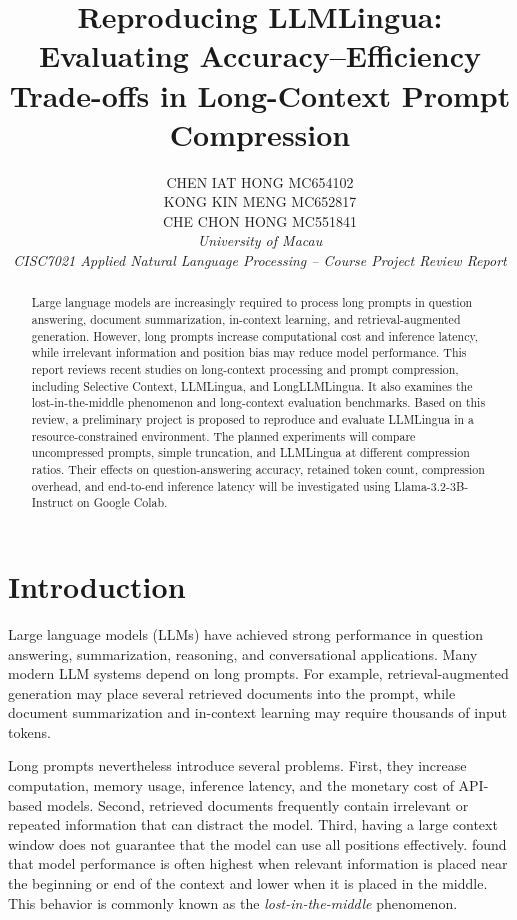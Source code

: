 \documentclass[10pt,a4paper,twocolumn]{article}
\title{Reproducing LLMLingua: Evaluating Accuracy--Efficiency Trade-offs in Long-Context Prompt Compression}
\author{
CHEN IAT HONG \quad MC654102\\
KONG KIN MENG \quad MC652817\\
CHE CHON HONG \quad MC551841\\
\textit{University of Macau}\\
\textit{CISC7021 Applied Natural Language Processing -- Course Project Review Report}
}
\date{}
\begin{document}
\maketitle
\vspace{-0.8cm}

\begin{abstract}
Large language models are increasingly required to process long prompts in question answering, document summarization, in-context learning, and retrieval-augmented generation. However, long prompts increase computational cost and inference latency, while irrelevant information and position bias may reduce model performance. This report reviews recent studies on long-context processing and prompt compression, including Selective Context, LLMLingua, and LongLLMLingua. It also examines the lost-in-the-middle phenomenon and long-context evaluation benchmarks. Based on this review, a preliminary project is proposed to reproduce and evaluate LLMLingua in a resource-constrained environment. The planned experiments will compare uncompressed prompts, simple truncation, and LLMLingua at different compression ratios. Their effects on question-answering accuracy, retained token count, compression overhead, and end-to-end inference latency will be investigated using Llama-3.2-3B-Instruct on Google Colab.
\end{abstract}

\section{Introduction}

Large language models (LLMs) have achieved strong performance in question answering, summarization, reasoning, and conversational applications. Many modern LLM systems depend on long prompts. For example, retrieval-augmented generation may place several retrieved documents into the prompt, while document summarization and in-context learning may require thousands of input tokens.

Long prompts nevertheless introduce several problems. First, they increase computation, memory usage, inference latency, and the monetary cost of API-based models. Second, retrieved documents frequently contain irrelevant or repeated information that can distract the model. Third, having a large context window does not guarantee that the model can use all positions effectively. \citet{liu-etal-2024-lost} found that model performance is often highest when relevant information is placed near the beginning or end of the context and lower when it is placed in the middle. This behavior is commonly known as the \textit{lost-in-the-middle} phenomenon.
\end{document}
